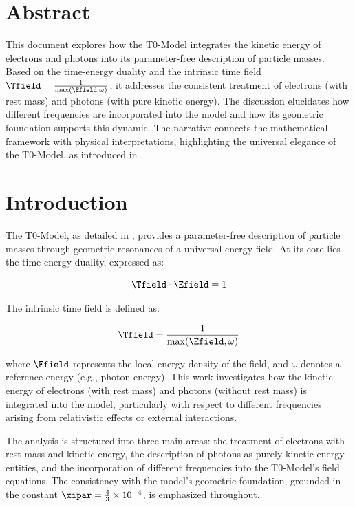 \section*{Abstract}
This document explores how the T0-Model integrates the kinetic energy of electrons and photons into its parameter-free description of particle masses. Based on the time-energy duality and the intrinsic time field \( \Tfield = \frac{1}{\max(\Efield, \omega)} \), it addresses the consistent treatment of electrons (with rest mass) and photons (with pure kinetic energy). The discussion elucidates how different frequencies are incorporated into the model and how its geometric foundation supports this dynamic. The narrative connects the mathematical framework with physical interpretations, highlighting the universal elegance of the T0-Model, as introduced in \cite{pascher_t0_energy_2025}.

\section{Introduction}
\label{sec:introduction}

The T0-Model, as detailed in \cite{pascher_t0_energy_2025}, provides a parameter-free description of particle masses through geometric resonances of a universal energy field. At its core lies the time-energy duality, expressed as:

\begin{equation}
	\Tfield \cdot \Efield = 1
	\label{eq:time_energy_duality}
\end{equation}

The intrinsic time field is defined as:

\begin{equation}
	\Tfield = \frac{1}{\max(\Efield, \omega)}
	\label{eq:intrinsic_time_field}
\end{equation}

where \( \Efield \) represents the local energy density of the field, and \(\omega\) denotes a reference energy (e.g., photon energy). This work investigates how the kinetic energy of electrons (with rest mass) and photons (without rest mass) is integrated into the model, particularly with respect to different frequencies arising from relativistic effects or external interactions.

The analysis is structured into three main areas: the treatment of electrons with rest mass and kinetic energy, the description of photons as purely kinetic energy entities, and the incorporation of different frequencies into the T0-Model's field equations. The consistency with the model's geometric foundation, grounded in the constant \(\xipar = \frac{4}{3} \times 10^{-4}\), is emphasized throughout.

